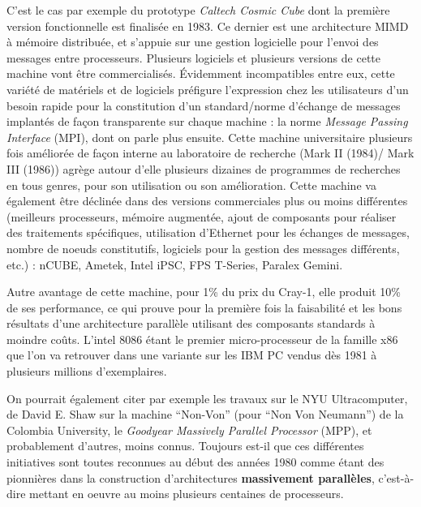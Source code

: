 C'est le cas par exemple du prototype \textit{Caltech Cosmic Cube} dont la première version fonctionnelle est finalisée en 1983. Ce dernier est une architecture MIMD à mémoire distribuée, et s'appuie sur une gestion logicielle pour l'envoi des messages entre processeurs. Plusieurs logiciels et plusieurs versions de cette machine vont être commercialisés. Évidemment incompatibles entre eux, cette variété de matériels et de logiciels préfigure l'expression chez les utilisateurs d'un besoin rapide pour la constitution d'un standard/norme d'échange de messages implantés de façon transparente sur chaque machine : la norme \textit{Message Passing Interface} (MPI), dont on parle plus ensuite. Cette machine universitaire plusieurs fois améliorée de façon interne au laboratoire de recherche (Mark II (1984)/ Mark III (1986)) agrège autour d'elle plusieurs dizaines de programmes de recherches en tous genres, pour son utilisation ou son amélioration. Cette machine va également être déclinée dans des versions commerciales plus ou moins différentes (meilleurs processeurs, mémoire augmentée, ajout de composants pour réaliser des traitements spécifiques, utilisation d'Ethernet pour les échanges de messages, nombre de noeuds constitutifs, logiciels pour la gestion des messages différents, etc.) : nCUBE, Ametek, Intel iPSC, FPS T-Series, Paralex Gemini.

Autre avantage de cette machine, pour 1\% du prix du Cray-1, elle produit 10\% de ses performance, ce qui prouve pour la première fois la faisabilité et les bons résultats d'une architecture parallèle utilisant des composants standards à moindre coûts. L'intel 8086 étant le premier micro-processeur de la famille x86 que l'on va retrouver dans une variante sur les IBM PC vendus dès 1981 à plusieurs millions d'exemplaires. %

On pourrait également citer par exemple les travaux sur le NYU Ultracomputer, de David E. Shaw sur la machine \enquote{Non-Von} (pour \enquote{Non Von Neumann}) de la Colombia University, le \textit{Goodyear Massively Parallel Processor} (MPP), et probablement d'autres, moins connus. Toujours est-il que ces différentes initiatives sont toutes reconnues au début des années 1980 comme étant des pionnières dans la construction d’architectures \textbf{massivement parallèles}, c'est-à-dire mettant en oeuvre au moins plusieurs centaines de processeurs.

